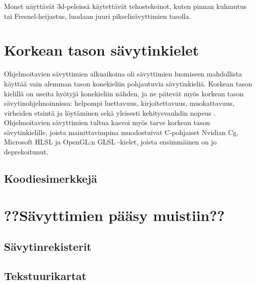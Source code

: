 \documentclass[finnish]{tktltiki2}
\theoremstyle{definition}
\theoremstyle{remark}
\begin{document}
Monet näyttävät 3d-peleissä käytettävät tehostekeinot, kuten pinnan kuhmutus tai Fresnel-heijastus, luodaan juuri pikselisävyttimien tasolla.

\section{Korkean tason sävytinkielet}

Ohjelmoitavien sävyttimien alkuaikoina oli sävyttimien luomiseen mahdollista käyttää vain alemman tason konekieliin pohjautuvia sävytinkieliä. Korkean tason kielillä on useita hyötyjä konekieliin nähden, ja ne pätevät myös korkean tason sävytinohjelmoinnissa: helpompi luettavuus, kirjoitettavuus, muokattavuus, virheiden etsintä ja löytäminen sekä yleisesti kehitysvauhdin nopeus \cite{She08}. Ohjelmoitavien sävyttimien tultua kasvoi myös tarve korkean tason sävytinkielille, joista mainittavimpina muodostuivat C-pohjaiset Nvidian Cg, Microsoft HLSL ja OpenGL:n GLSL -kielet, joista ensimmäinen on jo deprekoitunut.

\subsection{Koodiesimerkkejä}

\section{??Sävyttimien pääsy muistiin??}
\subsection{Sävytinrekisterit}
\subsection{Tekstuurikartat}


%
%
% 
%







% 
\end{document}
